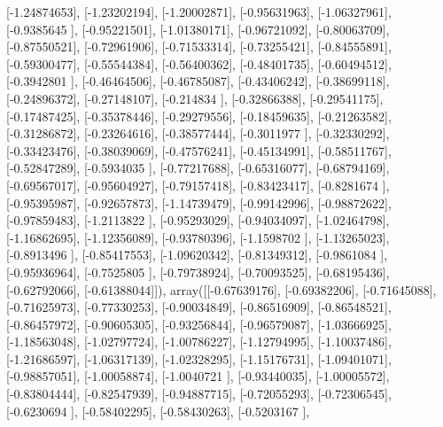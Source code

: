 \documentclass{article}
\begin{document}
       [-1.24874653],
       [-1.23202194],
       [-1.20002871],
       [-0.95631963],
       [-1.06327961],
       [-0.9385645 ],
       [-0.95221501],
       [-1.01380171],
       [-0.96721092],
       [-0.80063709],
       [-0.87550521],
       [-0.72961906],
       [-0.71533314],
       [-0.73255421],
       [-0.84555891],
       [-0.59300477],
       [-0.55544384],
       [-0.56400362],
       [-0.48401735],
       [-0.60494512],
       [-0.3942801 ],
       [-0.46464506],
       [-0.46785087],
       [-0.43406242],
       [-0.38699118],
       [-0.24896372],
       [-0.27148107],
       [-0.214834  ],
       [-0.32866388],
       [-0.29541175],
       [-0.17487425],
       [-0.35378446],
       [-0.29279556],
       [-0.18459635],
       [-0.21263582],
       [-0.31286872],
       [-0.23264616],
       [-0.38577444],
       [-0.3011977 ],
       [-0.32330292],
       [-0.33423476],
       [-0.38039069],
       [-0.47576241],
       [-0.45134991],
       [-0.58511767],
       [-0.52847289],
       [-0.5934035 ],
       [-0.77217688],
       [-0.65316077],
       [-0.68794169],
       [-0.69567017],
       [-0.95604927],
       [-0.79157418],
       [-0.83423417],
       [-0.8281674 ],
       [-0.95395987],
       [-0.92657873],
       [-1.14739479],
       [-0.99142996],
       [-0.98872622],
       [-0.97859483],
       [-1.2113822 ],
       [-0.95293029],
       [-0.94034097],
       [-1.02464798],
       [-1.16862695],
       [-1.12356089],
       [-0.93780396],
       [-1.1598702 ],
       [-1.13265023],
       [-0.8913496 ],
       [-0.85417553],
       [-1.09620342],
       [-0.81349312],
       [-0.9861084 ],
       [-0.95936964],
       [-0.7525805 ],
       [-0.79738924],
       [-0.70093525],
       [-0.68195436],
       [-0.62792066],
       [-0.61388044]]), array([[-0.67639176],
       [-0.69382206],
       [-0.71645088],
       [-0.71625973],
       [-0.77330253],
       [-0.90034849],
       [-0.86516909],
       [-0.86548521],
       [-0.86457972],
       [-0.90605305],
       [-0.93256844],
       [-0.96579087],
       [-1.03666925],
       [-1.18563048],
       [-1.02797724],
       [-1.00786227],
       [-1.12794995],
       [-1.10037486],
       [-1.21686597],
       [-1.06317139],
       [-1.02328295],
       [-1.15176731],
       [-1.09401071],
       [-0.98857051],
       [-1.00058874],
       [-1.0040721 ],
       [-0.93440035],
       [-1.00005572],
       [-0.83804444],
       [-0.82547939],
       [-0.94887715],
       [-0.72055293],
       [-0.72306545],
       [-0.6230694 ],
       [-0.58402295],
       [-0.58430263],
       [-0.5203167 ],
\end{document}
